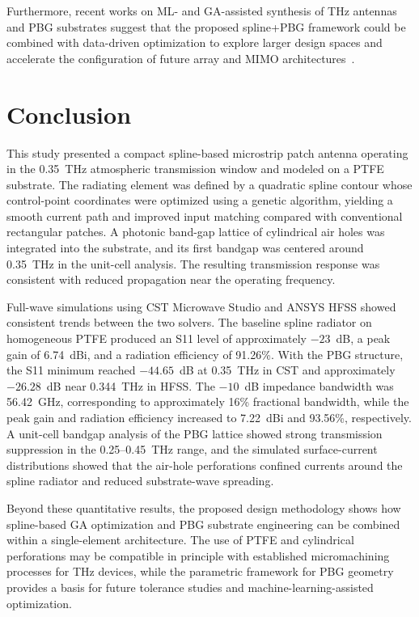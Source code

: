 \documentclass[a4paper,fleqn]{cas-dc}
\begin{document}
Furthermore, recent works on ML- and GA-assisted synthesis of THz antennas and PBG substrates suggest that the proposed spline+PBG framework could be combined with data-driven optimization to explore larger design spaces and accelerate the configuration of future array and MIMO architectures~\cite{babaahmed_hybrid_2025,merino_machine_2025}.


\section{Conclusion}
\label{sec:conclusion}

This study presented a compact spline-based microstrip patch antenna operating in the 0.35~THz atmospheric transmission window and modeled on a PTFE substrate. The radiating element was defined by a quadratic spline contour whose control-point coordinates were optimized using a genetic algorithm, yielding a smooth current path and improved input matching compared with conventional rectangular patches. A photonic band-gap lattice of cylindrical air holes was integrated into the substrate, and its first bandgap was centered around 0.35~THz in the unit-cell analysis. The resulting transmission response was consistent with reduced propagation near the operating frequency.

Full-wave simulations using CST Microwave Studio and ANSYS HFSS showed consistent trends between the two solvers. The baseline spline radiator on homogeneous PTFE produced an S11 level of approximately $-23$~dB, a peak gain of 6.74~dBi, and a radiation efficiency of 91.26\%. With the PBG structure, the S11 minimum reached $-44.65$~dB at 0.35~THz in CST and approximately $-26.28$~dB near 0.344~THz in HFSS. The \(-10\)~dB impedance bandwidth was 56.42~GHz, corresponding to approximately 16\% fractional bandwidth, while the peak gain and radiation efficiency increased to 7.22~dBi and 93.56\%, respectively. A unit-cell bandgap analysis of the PBG lattice showed strong transmission suppression in the 0.25--0.45~THz range, and the simulated surface-current distributions showed that the air-hole perforations confined currents around the spline radiator and reduced substrate-wave spreading.

Beyond these quantitative results, the proposed design methodology shows how spline-based GA optimization and PBG substrate engineering can be combined within a single-element architecture. The use of PTFE and cylindrical perforations may be compatible in principle with established micromachining processes for THz devices, while the parametric framework for PBG geometry provides a basis for future tolerance studies and machine-learning-assisted optimization.
\end{document}
